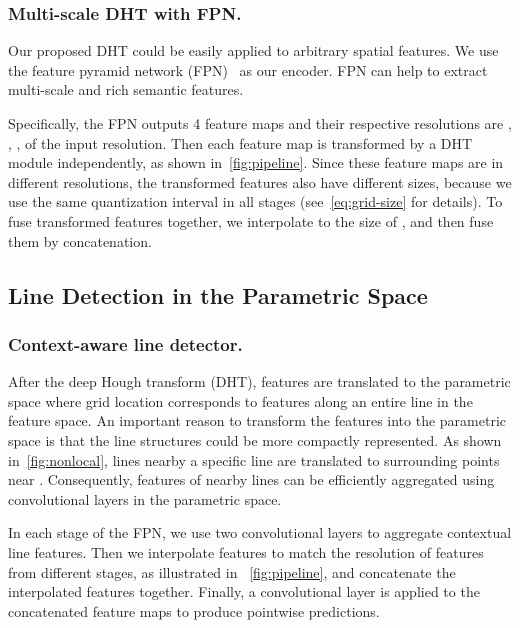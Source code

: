 \documentclass[10pt,journal,cspaper,compsoc]{IEEEtran}
\begin{document}
\subsubsection{Multi-scale DHT with FPN.}\label{sec:ms-dht-fpn}
Our proposed DHT could be easily applied to arbitrary spatial features.
We use the feature pyramid network (FPN)~\cite{lin2017feature} as our encoder.
FPN can help to extract multi-scale and rich semantic features.


Specifically, the FPN outputs 4 feature maps  and their respective
resolutions are , , ,  of the input resolution.
Then each feature map is transformed by a DHT module independently, as shown in~\cref{fig:pipeline}.
Since these feature maps are in different resolutions, the transformed features
 also have different sizes, because we use the same quantization
interval in all stages (see~\cref{eq:grid-size} for details).
To fuse transformed features together, we interpolate 
to the size of , and then fuse them by concatenation.

\subsection{Line Detection in the Parametric Space}


\subsubsection{Context-aware line detector.}\label{sec:ctx-line-detector}
After the deep Hough transform (DHT), features are translated to the parametric space
where grid location  corresponds to
features along an entire line  in the feature space.
An important reason to transform the features into the parametric space 
is that the line structures could
be more compactly represented.
As shown in~\cref{fig:nonlocal},
lines nearby a specific line  are translated to
surrounding points near .
Consequently, features of nearby lines can be efficiently aggregated
using convolutional layers in the parametric space.

In each stage of the FPN, 
we use two  convolutional  layers
to aggregate contextual line features.
Then we interpolate features
to match the resolution of features from different stages, as illustrated in
~\cref{fig:pipeline},
and concatenate the interpolated features together.
Finally, a  convolutional  layer is applied to the concatenated feature maps
to produce pointwise predictions.
\end{document}
